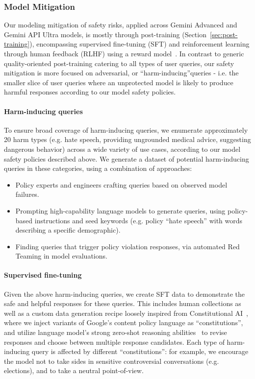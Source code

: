 \subsubsection{Model Mitigation}

Our modeling mitigation of safety risks, applied across Gemini Advanced and Gemini API Ultra models, is mostly through post-training (Section~\ref{sec:post-training}), encompassing supervised fine-tuning (SFT) and reinforcement learning through human feedback (RLHF) using a reward model~\citep{Bai2022-us}. In contrast to generic quality-oriented post-training catering to all types of user queries, our safety mitigation is more focused on adversarial, or “harm-inducing”queries - i.e. the smaller slice of user queries where an unprotected model is likely to produce harmful responses according to our model safety policies. 

\paragraph{Harm-inducing queries}

To ensure broad coverage of harm-inducing queries, we enumerate approximately 20 harm types (e.g. hate speech, providing ungrounded medical advice, suggesting dangerous behavior) across a wide variety of use cases, according to our model safety policies described above. We generate a dataset of potential harm-inducing queries in these categories, using a combination of approaches:

\begin{itemize}
    \item Policy experts and engineers crafting queries based on observed model failures.
    \item Prompting high-capability language models to generate queries, using policy-based instructions and seed keywords (e.g. policy “hate speech” with words describing a specific demographic).
    \item Finding queries that trigger policy violation responses, via automated Red Teaming in model evaluations.
\end{itemize}

\paragraph{Supervised fine-tuning}

Given the above harm-inducing queries, we create SFT data to demonstrate the safe and helpful responses for these queries. This includes human collections as well as a custom data generation recipe loosely inspired from Constitutional AI~\cite{bai2022constitutional}, where we inject variants of Google’s content policy language as “constitutions”, and utilize language model’s strong zero-shot reasoning abilities~\cite{kojima2022large} to revise responses and choose between multiple response candidates. Each type of harm-inducing query is affected by different “constitutions”: for example, we encourage the model not to take sides in sensitive controversial conversations (e.g. elections), and to take a neutral point-of-view.

